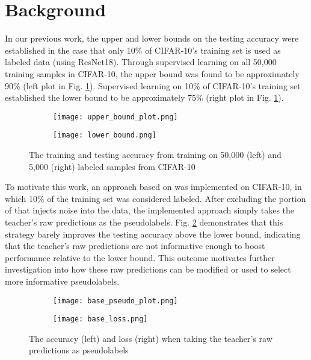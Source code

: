 \documentclass{article}
\begin{document}
\section{Background}
In our previous work, the upper and lower bounds on the testing accuracy were established in the case that only 10\% of CIFAR-10's training set is used as labeled data (using ResNet18). Through supervised learning on all 50,000 training samples in CIFAR-10, the upper bound was found to be approximately 90\% (left plot in Fig. \ref{upper_lower_bounds}). Supervised learning on 10\% of CIFAR-10's training set established the lower bound to be approximately 75\% (right plot in Fig. \ref{upper_lower_bounds}).
\begin{figure}[ht]
\centering
\begin{subfigure}{0.5\textwidth}
  \centering
  \texttt{[image: upper\_bound\_plot.png]}
\end{subfigure}%
\begin{subfigure}{0.5\textwidth}
  \centering
  \texttt{[image: lower\_bound.png]}
\end{subfigure}
\caption{The training and testing accuracy from training on 50,000 (left) and 5,000 (right) labeled samples from CIFAR-10}
\label{upper_lower_bounds}
\end{figure}

To motivate this work, an approach based on \cite{xie2019selftraining} was implemented on CIFAR-10, in which 10\% of the training set was considered labeled. After excluding the portion of \cite{xie2019selftraining} that injects noise into the data, the implemented approach simply takes the teacher's raw predictions as the pseudolabels. Fig. \ref{raw_pseudos} demonstrates that this strategy barely improves the testing accuracy above the lower bound, indicating that the teacher's raw predictions are not informative enough to boost performance relative to the lower bound. This outcome motivates further investigation into how these raw predictions can be modified or used to select more informative pseudolabels.

\begin{figure}[ht]
\centering
\begin{subfigure}{0.5\textwidth}
  \centering
  \texttt{[image: base\_pseudo\_plot.png]}
\end{subfigure}%
\begin{subfigure}{0.5\textwidth}
  \centering
  \texttt{[image: base\_loss.png]}
\end{subfigure}
\caption{The accuracy (left) and loss (right) when taking the teacher's raw predictions as pseudolabels}
\label{raw_pseudos}
\end{figure}
\end{document}
